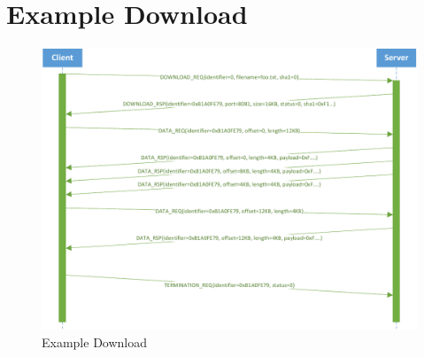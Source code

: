 \documentclass[]{article}
\begin{document}
\section{Example Download}


\begin{figure}[H]
\centering
\includegraphics[width=\textwidth]{frames/download-interaction.pdf}
\caption{Example Download}
\label{EXAMPLE-DOWNLOAD}
\end{figure}
\end{document}
